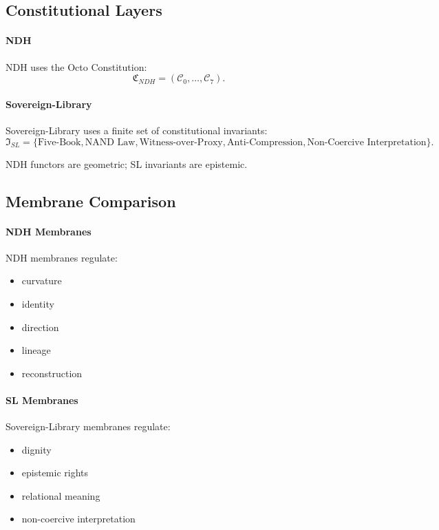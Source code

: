 \subsection{Constitutional Layers}

\paragraph{NDH}
NDH uses the Octo Constitution:
\[
\mathfrak{C}_{NDH} = (\mathcal{C}_0, \ldots, \mathcal{C}_7).
\]

\paragraph{Sovereign-Library}
Sovereign-Library uses a finite set of constitutional invariants:
\[
\mathfrak{I}_{SL} = \{\text{Five-Book}, \text{NAND Law}, 
\text{Witness-over-Proxy}, \text{Anti-Compression}, 
\text{Non-Coercive Interpretation}\}.
\]

NDH functors are geometric; SL invariants are epistemic.


\subsection{Membrane Comparison}

\paragraph{NDH Membranes}
NDH membranes regulate:
\begin{itemize}
    \item curvature
    \item identity
    \item direction
    \item lineage
    \item reconstruction
\end{itemize}

\paragraph{SL Membranes}
Sovereign-Library membranes regulate:
\begin{itemize}
    \item dignity
    \item epistemic rights
    \item relational meaning
    \item non-coercive interpretation
\end{itemize}

